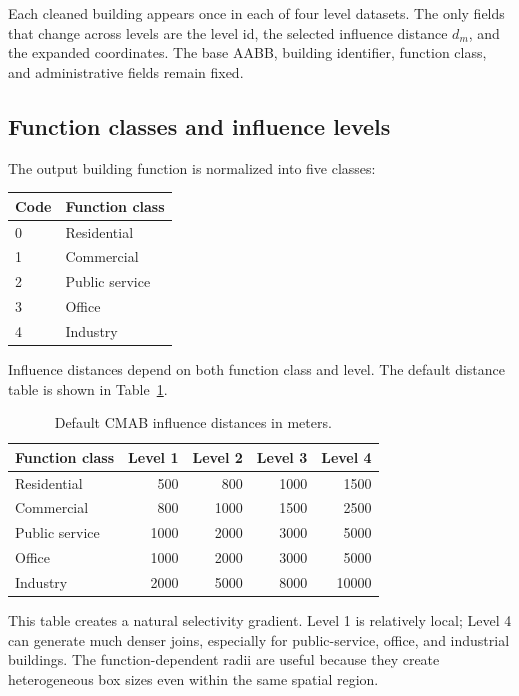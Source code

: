\documentclass[11pt]{article}
\newcommand{\cmab}{\textsc{CMAB}}
\begin{document}
Each cleaned building appears once in each of four level datasets.  The only fields that change across levels are the level id, the selected influence distance $d_m$, and the expanded coordinates.  The base AABB, building identifier, function class, and administrative fields remain fixed.

\subsection{Function classes and influence levels}

The output building function is normalized into five classes:
\begin{center}
\begin{tabular}{ll}
\toprule
Code & Function class \\
\midrule
0 & Residential \\
1 & Commercial \\
2 & Public service \\
3 & Office \\
4 & Industry \\
\bottomrule
\end{tabular}
\end{center}

Influence distances depend on both function class and level.  The default distance table is shown in Table~\ref{tab:cmab-distances}.

\begin{table}[t]
\centering
\small
\begin{tabular}{lrrrr}
\toprule
Function class & Level 1 & Level 2 & Level 3 & Level 4 \\
\midrule
Residential    &  500 &  800 & 1000 &  1500 \\
Commercial     &  800 & 1000 & 1500 &  2500 \\
Public service & 1000 & 2000 & 3000 &  5000 \\
Office         & 1000 & 2000 & 3000 &  5000 \\
Industry       & 2000 & 5000 & 8000 & 10000 \\
\bottomrule
\end{tabular}
\caption{Default \cmab{} influence distances in meters.}
\label{tab:cmab-distances}
\end{table}

This table creates a natural selectivity gradient.  Level 1 is relatively local; Level 4 can generate much denser joins, especially for public-service, office, and industrial buildings.  The function-dependent radii are useful because they create heterogeneous box sizes even within the same spatial region.
\end{document}
